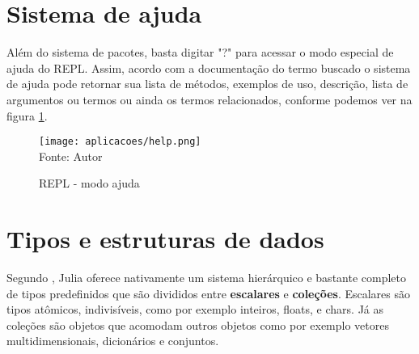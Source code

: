 
\section{Sistema de ajuda}
Além do sistema de pacotes, basta digitar "?"  para acessar o modo especial de ajuda do REPL. Assim, acordo com a documentação do termo buscado o sistema de ajuda pode retornar sua lista de métodos, exemplos de uso, descrição, lista de argumentos ou termos ou ainda os termos relacionados, conforme podemos ver na figura \ref{ajuda}. 
    \begin{figure}[H]
    \begin{center}
        \caption{REPL - modo ajuda} \label{ajuda}
        \texttt{[image: aplicacoes/help.png]} \\
        {\tiny \sf Fonte: Autor}
    \end{center}
    \end{figure} 

\section{Tipos e estruturas de dados}
Segundo \cite{Lobianco2019}, Julia oferece nativamente um sistema hierárquico e bastante completo de tipos predefinidos que são divididos entre \textbf{escalares} e \textbf{coleções}.
Escalares são tipos atômicos, indivisíveis, como por exemplo inteiros, floats, e chars. Já as coleções são objetos que acomodam outros objetos como por exemplo vetores multidimensionais, dicionários e conjuntos.

